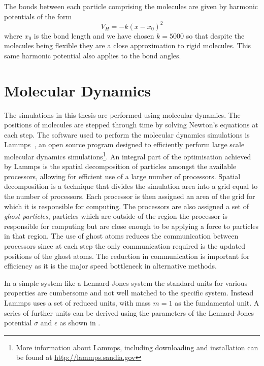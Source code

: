 The bonds between each particle comprising the molecules are given by harmonic potentials of the form
\begin{equation}
    V_H = - k (x - x_0)^2
\end{equation}
where $x_0$ is the bond length and we have chosen $k = 5000$ so that despite the molecules being flexible they are a close approximation to rigid molecules. This same harmonic potential also applies to the bond angles.


\section{Molecular Dynamics}

The simulations in this thesis are performed using molecular dynamics. The positions of molecules are stepped through time by solving Newton's equations at each step. The software used to perform the molecular dynamics simulations is Lammps~\cite{plimpton:95b}, an open source program designed to efficiently perform large scale molecular dynamics simulations\footnote{More information about Lammps, including downloading and installation can be found at \href{http://lammps.sandia.gov}{http://lammps.sandia.gov}}. An integral part of the optimisation achieved by Lammps is the spatial decomposition of particles amongst the available processors, allowing for efficient use of a large number of processors. Spatial decomposition is a technique that divides the simulation area into a grid equal to the number of processors. Each processor is then assigned an area of the grid for which it is responsible for computing. The processors are also assigned a set of \emph{ghost particles}, particles which are outside of the region the processor is responsible for computing but are close enough to be applying a force to particles in that region. The use of ghost atoms reduces the communication between processors since at each step the only communication required is the updated positions of the ghost atoms. The reduction in communication is important for efficiency as it is the major speed bottleneck in alternative methods.

In a simple system like a Lennard-Jones system the standard units for various properties are cumbersome and not well matched to the specific system. Instead Lammps uses a set of reduced units, with mass $m = 1$ as the fundamental unit. A series of further units can be derived using the parameters of the Lennard-Jones potential $\sigma$ and $\epsilon$ as shown in .

